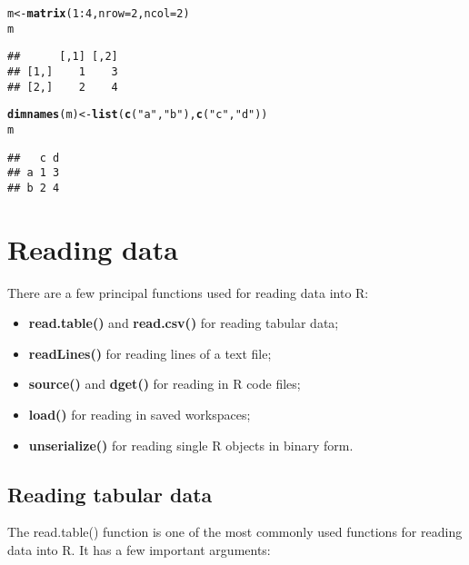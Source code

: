 \documentclass[10pt,a4paper,twoside]{article}\usepackage[]{graphicx}\usepackage[]{xcolor}
\makeatletter
\newcommand{\hlnum}[1]{\textcolor[rgb]{0.686,0.059,0.569}{#1}}%
\newcommand{\hlsng}[1]{\textcolor[rgb]{0.192,0.494,0.8}{#1}}%
\newcommand{\hlopt}[1]{\textcolor[rgb]{0,0,0}{#1}}%
\newcommand{\hldef}[1]{\textcolor[rgb]{0.345,0.345,0.345}{#1}}%
\newcommand{\hlkwb}[1]{\textcolor[rgb]{0.69,0.353,0.396}{#1}}%
\newcommand{\hlkwc}[1]{\textcolor[rgb]{0.333,0.667,0.333}{#1}}%
\newcommand{\hlkwd}[1]{\textcolor[rgb]{0.737,0.353,0.396}{\textbf{#1}}}%
\newenvironment{kframe}{%
 \def\at@end@of@kframe{}%
 \ifinner\ifhmode%
  \def\at@end@of@kframe{\end{minipage}}%
  \begin{minipage}{\columnwidth}%
 \fi\fi%
 \def\FrameCommand##1{\hskip\@totalleftmargin \hskip-\fboxsep
 \colorbox{shadecolor}{##1}\hskip-\fboxsep
     \hskip-\linewidth \hskip-\@totalleftmargin \hskip\columnwidth}%
 \MakeFramed {\advance\hsize-\width
   \@totalleftmargin\z@ \linewidth\hsize
   \@setminipage}}%
 {\par\unskip\endMakeFramed%
 \at@end@of@kframe}
\newenvironment{knitrout}{}{} %
\makeatother
\begin{document}
\begin{knitrout}
\color{fgcolor}\begin{kframe}
\begin{alltt}
\hldef{m} \hlkwb{<-} \hlkwd{matrix}\hldef{(}\hlnum{1}\hlopt{:}\hlnum{4}\hldef{,} \hlkwc{nrow} \hldef{=} \hlnum{2}\hldef{,} \hlkwc{ncol} \hldef{=} \hlnum{2}\hldef{)}
\hldef{m}
\end{alltt}
\begin{verbatim}
##      [,1] [,2]
## [1,]    1    3
## [2,]    2    4
\end{verbatim}
\begin{alltt}
\hlkwd{dimnames}\hldef{(m)} \hlkwb{<-} \hlkwd{list}\hldef{(}\hlkwd{c}\hldef{(}\hlsng{"a"}\hldef{,} \hlsng{"b"}\hldef{),} \hlkwd{c}\hldef{(}\hlsng{"c"}\hldef{,} \hlsng{"d"}\hldef{))}
\hldef{m}
\end{alltt}
\begin{verbatim}
##   c d
## a 1 3
## b 2 4
\end{verbatim}
\end{kframe}
\end{knitrout}

\section{Reading data}

There are a few principal functions used for reading data into R:

\begin{itemize}
  \item \textbf{read.table()} and \textbf{read.csv()} for reading tabular data;
  \item \textbf{readLines()} for reading lines of a text file;
  \item \textbf{source()} and \textbf{dget()} for reading in R code files;
  \item \textbf{load()} for reading in saved workspaces;
  \item \textbf{unserialize()} for reading single R objects in binary form.
\end{itemize}

\subsection{Reading tabular data}

The read.table() function is one of the most commonly used functions for reading data into R. It has a few important arguments:
\end{document}
